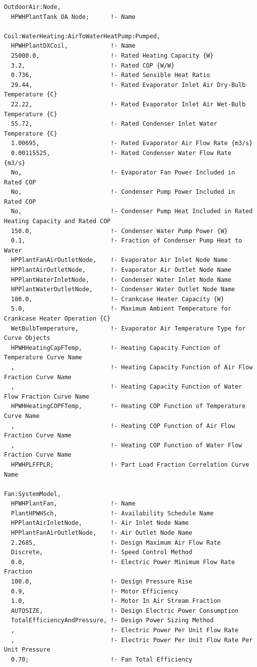 \begin{lstlisting}
OutdoorAir:Node,
  HPWHPlantTank OA Node;      !- Name

Coil:WaterHeating:AirToWaterHeatPump:Pumped,
  HPWHPlantDXCoil,            !- Name
  25000.0,                    !- Rated Heating Capacity {W}
  3.2,                        !- Rated COP {W/W}
  0.736,                      !- Rated Sensible Heat Ratio
  29.44,                      !- Rated Evaporator Inlet Air Dry-Bulb Temperature {C}
  22.22,                      !- Rated Evaporator Inlet Air Wet-Bulb Temperature {C}
  55.72,                      !- Rated Condenser Inlet Water Temperature {C}
  1.00695,                    !- Rated Evaporator Air Flow Rate {m3/s}
  0.00115525,                 !- Rated Condenser Water Flow Rate {m3/s}
  No,                         !- Evaporator Fan Power Included in Rated COP
  No,                         !- Condenser Pump Power Included in Rated COP
  No,                         !- Condenser Pump Heat Included in Rated Heating Capacity and Rated COP
  150.0,                      !- Condenser Water Pump Power {W}
  0.1,                        !- Fraction of Condenser Pump Heat to Water
  HPPlantFanAirOutletNode,    !- Evaporator Air Inlet Node Name
  HPPlantAirOutletNode,       !- Evaporator Air Outlet Node Name
  HPPlantWaterInletNode,      !- Condenser Water Inlet Node Name
  HPPlantWaterOutletNode,     !- Condenser Water Outlet Node Name
  100.0,                      !- Crankcase Heater Capacity {W}
  5.0,                        !- Maximum Ambient Temperature for Crankcase Heater Operation {C}
  WetBulbTemperature,         !- Evaporator Air Temperature Type for Curve Objects
  HPWHHeatingCapFTemp,        !- Heating Capacity Function of Temperature Curve Name
  ,                           !- Heating Capacity Function of Air Flow Fraction Curve Name
  ,                           !- Heating Capacity Function of Water Flow Fraction Curve Name
  HPWHHeatingCOPFTemp,        !- Heating COP Function of Temperature Curve Name
  ,                           !- Heating COP Function of Air Flow Fraction Curve Name
  ,                           !- Heating COP Function of Water Flow Fraction Curve Name
  HPWHPLFFPLR;                !- Part Load Fraction Correlation Curve Name

Fan:SystemModel,
  HPWHPlantFan,               !- Name
  PlantHPWHSch,               !- Availability Schedule Name
  HPPlantAirInletNode,        !- Air Inlet Node Name
  HPPlantFanAirOutletNode,    !- Air Outlet Node Name
  2.2685,                     !- Design Maximum Air Flow Rate
  Discrete,                   !- Speed Control Method
  0.0,                        !- Electric Power Minimum Flow Rate Fraction
  100.0,                      !- Design Pressure Rise
  0.9,                        !- Motor Efficiency
  1.0,                        !- Motor In Air Stream Fraction
  AUTOSIZE,                   !- Design Electric Power Consumption
  TotalEfficiencyAndPressure, !- Design Power Sizing Method
  ,                           !- Electric Power Per Unit Flow Rate
  ,                           !- Electric Power Per Unit Flow Rate Per Unit Pressure
  0.70;                       !- Fan Total Efficiency
\end{lstlisting}

